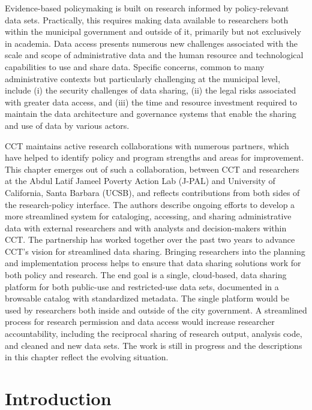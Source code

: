 \documentclass[
]{book}
\begin{document}
Evidence-based policymaking is built on research informed by policy-relevant data sets. Practically, this requires making data available to researchers both within the municipal government and outside of it, primarily but not exclusively in academia. Data access presents numerous new challenges associated with the scale and scope of administrative data and the human resource and technological capabilities to use and share data. Specific concerns, common to many administrative contexts but particularly challenging at the municipal level, include (i) the security challenges of data sharing, (ii) the legal risks associated with greater data access, and (iii) the time and resource investment required to maintain the data architecture and governance systems that enable the sharing and use of data by various actors.

CCT maintains active research collaborations with numerous partners, which have helped to identify policy and program strengths and areas for improvement. This chapter emerges out of such a collaboration, between CCT and researchers at the Abdul Latif Jameel Poverty Action Lab (J-PAL) and University of California, Santa Barbara (UCSB), and reflects contributions from both sides of the research-policy interface. The authors describe ongoing efforts to develop a more streamlined system for cataloging, accessing, and sharing administrative data with external researchers and with analysts and decision-makers within CCT. The partnership has worked together over the past two years to advance CCT's vision for streamlined data sharing. Bringing researchers into the planning and implementation process helps to ensure that data sharing solutions work for both policy and research. The end goal is a single, cloud-based, data sharing platform for both public-use and restricted-use data sets, documented in a browsable catalog with standardized metadata. The single platform would be used by researchers both inside and outside of the city government. A streamlined process for research permission and data access would increase researcher accountability, including the reciprocal sharing of research output, analysis code, and cleaned and new data sets. The work is still in progress and the descriptions in this chapter reflect the evolving situation.

\hypertarget{introduction-7}{%
\section{Introduction}\label{introduction-7}}
\end{document}
